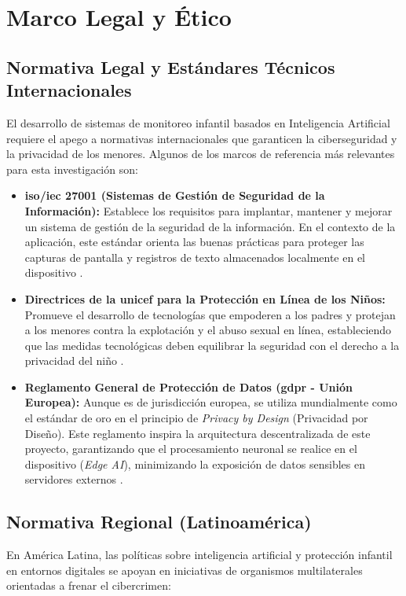 \chapter[Marco Legal y Ético]{Marco Legal y Ético}
\label{ch:marco-legal}

\insertminitoc
\parindent0pt

\section{Normativa Legal y Estándares Técnicos Internacionales}
El desarrollo de sistemas de monitoreo infantil basados en Inteligencia Artificial requiere el apego a normativas internacionales que garanticen la ciberseguridad y la privacidad de los menores. Algunos de los marcos de referencia más relevantes para esta investigación son:

\begin{itemize}
    \item \textbf{\gls{iso}/\gls{iec} 27001 (Sistemas de Gestión de Seguridad de la Información):} Establece los requisitos para implantar, mantener y mejorar un sistema de gestión de la seguridad de la información. En el contexto de la aplicación, este estándar orienta las buenas prácticas para proteger las capturas de pantalla y registros de texto almacenados localmente en el dispositivo \cite{iso_27001}.
    \item \textbf{Directrices de la \gls{unicef} para la Protección en Línea de los Niños:} Promueve el desarrollo de tecnologías que empoderen a los padres y protejan a los menores contra la explotación y el abuso sexual en línea, estableciendo que las medidas tecnológicas deben equilibrar la seguridad con el derecho a la privacidad del niño \cite{icmec_unicef_2020}.
    \item \textbf{Reglamento General de Protección de Datos (\gls{gdpr} - Unión Europea):} Aunque es de jurisdicción europea, se utiliza mundialmente como el estándar de oro en el principio de \textit{Privacy by Design} (Privacidad por Diseño). Este reglamento inspira la arquitectura descentralizada de este proyecto, garantizando que el procesamiento neuronal se realice en el dispositivo (\textit{Edge AI}), minimizando la exposición de datos sensibles en servidores externos \cite{gdpr_eu}.
\end{itemize}

\section{Normativa Regional (Latinoamérica)}
En América Latina, las políticas sobre inteligencia artificial y protección infantil en entornos digitales se apoyan en iniciativas de organismos multilaterales orientadas a frenar el cibercrimen:

